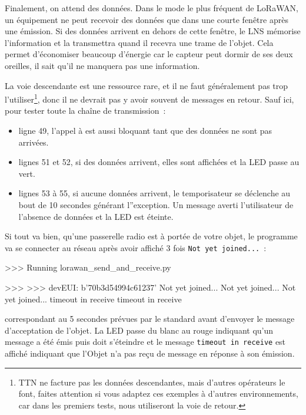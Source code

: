
Finalement, on attend des données. Dans le mode le plus fréquent de LoRaWAN, un équipement ne peut recevoir des données que dans une courte fenêtre après une émission. Si des données arrivent en dehors de cette fenêtre, le LNS mémorise l'information et la transmettra quand il recevra une trame de l'objet. Cela permet d'économiser beaucoup d'énergie car le capteur peut dormir de ses deux oreilles, il sait qu'il ne manquera pas une information.

La voie descendante est une ressource rare, et il ne faut généralement pas trop l'utiliser\footnote{TTN ne facture pas les données descendantes, mais d'autres opérateurs le font, faites attention si vous adaptez ces exemples à d'autres environnements, car dans les premiers tests, nous utiliseront la voie de retour.}, donc il ne devrait pas y avoir souvent de messages en retour. Sauf ici, pour tester toute la chaîne de transmission~:
\begin{itemize}
    \item ligne 49, l'appel à  est aussi bloquant tant que des données ne sont pas arrivées. 
    \item lignes 51 et 52, si des données arrivent, elles sont affichées et la LED passe au vert.
    \item lignes 53 à 55, si aucune données arrivent, le temporisateur se déclenche au bout de 10 secondes générant l''exception. Un message averti l'utilisateur de l'absence de données et la LED est éteinte.
\end{itemize}

         \vspace{1em}

Si tout va bien, qu'une passerelle radio est à portée de votre objet, le programme   va se connecter au réseau après avoir affiché 3 fois \texttt{Not yet joined...}~:


\begin{termc}[backgroundcolor=\color{gray!10}, basicstyle=\ttfamily\small, escapechar=@] 
>>> Running lorawan_send_and_receive.py

>>>
>>>
devEUI:  b'70b3d54994c61237'
Not yet joined...
Not yet joined...
Not yet joined...
timeout in receive
timeout in receive
\end{termc}


\noindent correspondant au 5 secondes prévues par le standard avant d'envoyer le message d'acceptation de l'objet. 
La LED passe du blanc au rouge indiquant qu'un message a été émis puis doit s'éteindre et le message \texttt{timeout in receive} est affiché indiquant que l'Objet n'a pas reçu de message en réponse à son émission.

